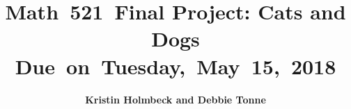 


\newcommand{\hmwkTitle}{Final Project: Cats and Dogs} %
\newcommand{\hmwkDueDate}{Tuesday,\ May\ 15,\ 2018} %
\newcommand{\hmwkClass}{Math\ 521} %
\newcommand{\hmwkAuthorName}{Kristin Holmbeck and Debbie Tonne} %


\title{
\textmd{\textbf{\hmwkClass \ \hmwkTitle}}\\
\normalsize\vspace{0.1in}\small{Due\ on\ \hmwkDueDate}\\
\vspace{0.1in}
\vspace{0.2in}
}

\author{\textbf{\hmwkAuthorName}}
\date{} %




\maketitle


\vspace{0.75in}
\tableofcontents
\listoffigures
\newpage



